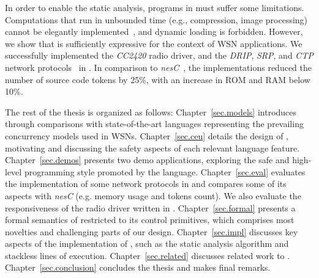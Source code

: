 In order to enable the static analysis, programs in \CEU must suffer some 
limitations.
Computations that run in unbounded time (e.g., compression, image processing) 
cannot be elegantly implemented~\cite{rp.hypothesis}, and dynamic loading is 
forbidden.
%
%
However, we show that \CEU is sufficiently expressive for the context of WSN 
applications.
We successfully implemented the \emph{CC2420} radio driver, and the 
\emph{DRIP}, \emph{SRP}, and \emph{CTP} network protocols~\cite{wsn.teps} in 
\CEU.
In comparison to \emph{nesC}~\cite{wsn.nesc}, the implementations reduced the 
number of source code tokens by 25\%, with an increase in ROM and RAM below 
10\%.


The rest of the thesis is organized as follows:
%
Chapter~\ref{sec.models} introduces \CEU through comparisons with 
state-of-the-art languages representing the prevailing concurrency models used 
in WSNs.
%
Chapter~\ref{sec.ceu} details the design of \CEU, motivating and discussing the
safety aspects of each relevant language feature.
%
Chapter~\ref{sec.demos} presents two demo applications, exploring the safe and 
high-level programming style promoted by the language.
%
Chapter~\ref{sec.eval} evaluates the implementation of some network protocols 
in \CEU and compares some of its aspects with \emph{nesC} (e.g. memory usage 
and tokens count).
We also evaluate the responsiveness of the radio driver written in \CEU.
%
Chapter~\ref{sec.formal} presents a formal semantics of \CEU restricted to its 
control primitives, which comprises most novelties and challenging parts of our 
design.
%
Chapter~\ref{sec.impl} discusses key aspects of the implementation of \CEU, 
such as the static analysis algorithm and stackless lines of execution.
%
Chapter~\ref{sec.related} discusses related work to \CEU.
%
Chapter~\ref{sec.conclusion} concludes the thesis and makes final remarks.
